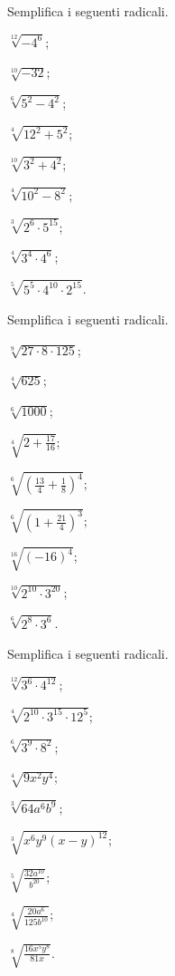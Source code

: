 \begin{esercizio}[\Ast]
 \label{ese:2.25}
Semplifica i seguenti radicali.
 \begin{multicols}{3}
 \begin{enumeratea}
 \item $\sqrt[12]{-4^6}$;
 \item $\sqrt[10]{-32}$;
 \item $\sqrt[6]{5^2-4^2}$;
 \item $\sqrt[4]{12^2+5^2}$;
 \item $\sqrt[10]{3^2+4^2}$;
 \item $\sqrt[4]{10^2-8^2}$;
 \item $\sqrt[3]{2^6\cdot 5^{15}}$;
 \item $\sqrt[4]{3^4\cdot 4^6}$;
 \item $\sqrt[5]{5^5\cdot 4^{10}\cdot 2^{15}}$.
 \end{enumeratea}
 \end{multicols}
\end{esercizio}

\begin{esercizio}[\Ast]
 \label{ese:2.26}
Semplifica i seguenti radicali.
 \begin{multicols}{3}
 \begin{enumeratea}
 \item $\sqrt[9]{27\cdot 8\cdot 125}$;
 \item $\sqrt[4]{625}$;
 \item $\sqrt[6]{1000}$;
 \item $\sqrt[4]{2+\frac{17}{16}}$;
 \item $\sqrt[6]{\left(\frac{13} 4+\frac 1 8\right)^4}$;
 \item $\sqrt[6]{\left(1+\frac{21} 4\right)^3}$;
 \item $\sqrt[16]{(-16)^4}$;
 \item $\sqrt[10]{2^{10}\cdot 3^{20}}$;
 \item $\sqrt[6]{2^8\cdot 3^6}$.
 \end{enumeratea}
 \end{multicols}
\end{esercizio}

\begin{esercizio}[\Ast]
 \label{ese:2.27}
Semplifica i seguenti radicali.
 \begin{multicols}{3}
 \begin{enumeratea}
 \item $\sqrt[12]{3^6\cdot 4^{12}}$;
 \item $\sqrt[4]{2^{10}\cdot 3^{15}\cdot 12^5}$;
 \item $\sqrt[6]{3^9\cdot 8^2}$;
 \item $\sqrt[4]{9x^2y^4}$;
 \item $\sqrt[3]{64a^6b^9}$;
 \item $\sqrt[3]{x^6y^9(x-y)^{12}}$;
 \item $\sqrt[5]{\frac{32a^{10}}{b^{20}}}$;
 \item $\sqrt[4]{\frac{20a^6}{125b^{10}}}$;
 \item $\sqrt[8]{\frac{16x^5y^8}{81x}}$.
 \end{enumeratea}
 \end{multicols}
\end{esercizio}

